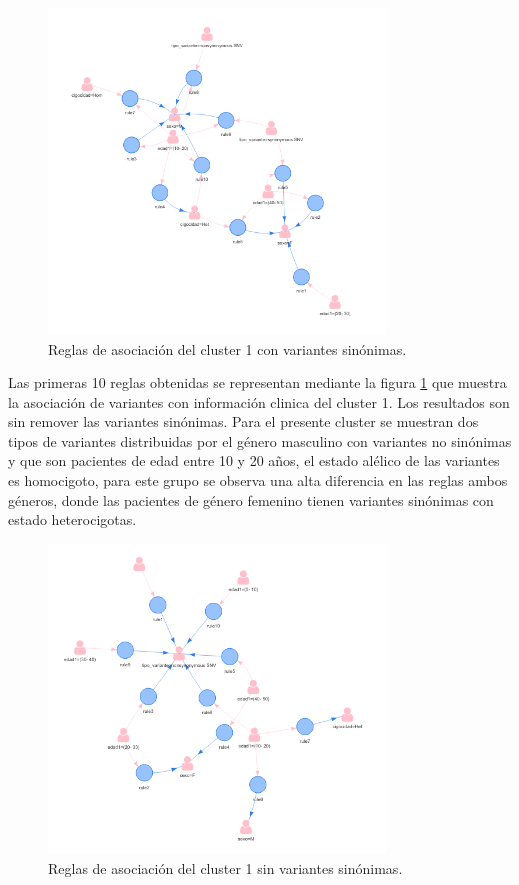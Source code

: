 \begin{figure}[H]
	\centering
	\includegraphics[width=0.8\textwidth]{Kap4/reglas1_1}
	\caption{Reglas de asociación del cluster 1 con variantes sinónimas.} \label{fig:reglas1}
\end{figure}

Las primeras 10 reglas obtenidas se representan mediante la figura \ref{fig:reglas1} que muestra la asociación de variantes con información clinica del cluster 1. Los resultados son sin remover las variantes sinónimas. Para el presente cluster se muestran dos tipos de variantes  distribuidas por el género masculino con variantes no sinónimas y que son pacientes de edad entre 10 y 20 años, el estado alélico de las variantes es homocigoto, para este grupo se observa una alta diferencia en las reglas ambos géneros, donde las pacientes de género femenino tienen variantes sinónimas con estado heterocigotas.

\begin{figure}[H]
	\centering
	\includegraphics[width=0.8\textwidth]{Kap4/reglas1_2}
	\caption{Reglas de asociación del cluster 1 sin variantes sinónimas.} \label{fig:reglas2}
\end{figure}


